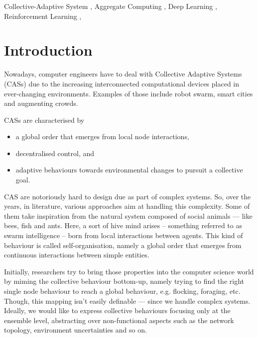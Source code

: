 \documentclass[
  twocolumn,
]{ceurart}
\begin{document}
\begin{keywords}
  Collective-Adaptive System \sep
  Aggregate Computing \sep
  Deep Learning \sep
  Reinforcement Learning \sep
\end{keywords}


\maketitle
{}
\section{Introduction}
Nowadays, computer engineers have to deal with Collective Adaptive Systems (CASs)
 due to the increasing interconnected computational devices placed in ever-changing environments.
 Examples of those include robot swarm, smart cities and augmenting crowds.

CASs are characterised by 
\begin{itemize}
\item a global order that emerges from local node interactions, 
\item  decentralised control, and 
\item adaptive behaviours towards environmental changes to pursuit a collective goal.
\end{itemize}
CAS are notoriously hard to design due as part of complex systems. 
%
So, over the years, in literature, various approaches aim at handling this complexity. 
%
Some of them take inspiration from the natural system
 composed of social animals --- like bees, fish and ants. 
%
Here, a sort of hive mind arises -- 
 something referred to as swarm intelligence -- 
born from local interactions between agents. 
%
This kind of behaviour is called self-organisation, 
 namely a global order that emerges from continuous 
 interactions between simple entities.

Initially, researchers try to bring those properties into  the computer science world 
 by miming the collective behaviour bottom-up, 
 namely trying to find the right single node behaviour 
 to reach a global behaviour, e.g. flocking, foraging, etc.
%
Though, this mapping isn't easily definable ---
 since we handle complex systems.
%
Ideally, we would like to express collective behaviours focusing only at the ensemble level,
 abstracting over non-functional aspects such as the network topology, environment uncertainties and 
 so on.
\end{document}
